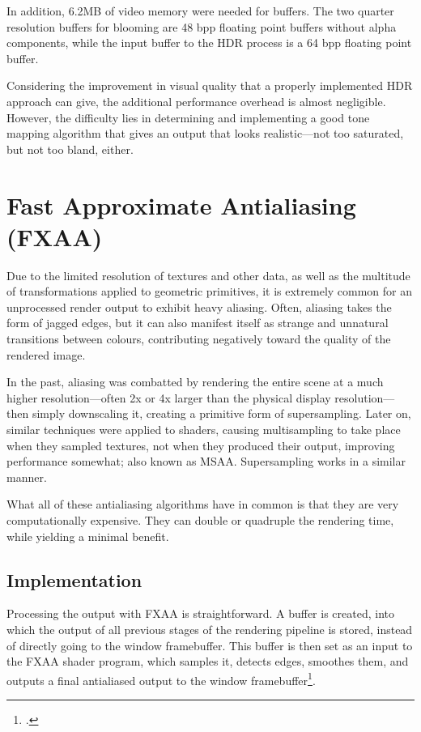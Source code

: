 \documentclass[11pt, oneside]{report}
\begin{document}
In addition, 6.2MB of video memory were needed for buffers. The two quarter resolution buffers for blooming are 48 \gls{bpp} floating point buffers without alpha components, while the input buffer to the HDR process is a 64 \gls{bpp} floating point buffer.

Considering the improvement in visual quality that a properly implemented \gls{HDR} approach can give, the additional performance overhead is almost negligible. However, the difficulty lies in determining and implementing a good \gls{tone mapping} algorithm that gives an output that looks realistic---not too saturated, but not too bland, either.



\chapter{Fast Approximate Antialiasing (FXAA)}
Due to the limited resolution of textures and other data, as well as the multitude of transformations applied to geometric primitives, it is extremely common for an unprocessed render output to exhibit heavy \gls{aliasing}. Often, \gls{aliasing} takes the form of jagged edges, but it can also manifest itself as strange and unnatural transitions between colours, contributing negatively toward the quality of the rendered image.

In the past, aliasing was combatted by rendering the entire scene at a much higher resolution---often 2x or 4x larger than the physical display resolution---then simply downscaling it, creating a primitive form of \gls{supersampling}. Later on, similar techniques were applied to \glspl{shader}, causing \gls{multisampling} to take place when they sampled textures, not when they produced their output, improving performance somewhat; also known as MSAA. Supersampling works in a similar manner.

What all of these antialiasing algorithms have in common is that they are very computationally expensive. They can double or quadruple the rendering time, while yielding a minimal benefit.

\section{Implementation}
Processing the output with \gls{FXAA} is straightforward. A buffer is created, into which the output of all previous stages of the rendering pipeline is stored, instead of directly going to the window framebuffer. This buffer is then set as an input to the \gls{FXAA} \gls{shader} program, which samples it, detects edges, smoothes them, and outputs a final antialiased output to the window framebuffer\footcite{nvidia-fxaa}.
\end{document}
